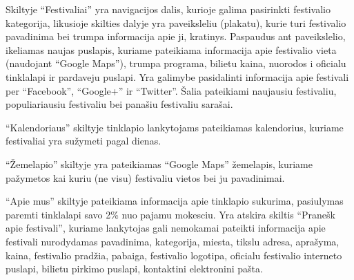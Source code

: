 ﻿\documentclass{VUMIFPSkursinis}
\begin{document}
Skiltyje “Festivaliai” yra navigacijos dalis, kurioje galima pasirinkti festivalio kategorija, likusioje skilties dalyje yra paveiksleliu (plakatu), kurie turi festivalio pavadinima bei trumpa informacija apie ji, kratinys. Paspaudus ant paveikslelio, ikeliamas naujas puslapis, kuriame pateikiama informacija apie festivalio vieta (naudojant “Google Maps”), trumpa programa, bilietu kaina, nuorodos i oficialu tinklalapi ir pardaveju puslapi. Yra galimybe pasidalinti informacija apie festivali per “Facebook”, “Google+” ir “Twitter”. Šalia pateikiami naujausiu festivaliu, populiariausiu festivaliu bei panašiu festivaliu sarašai. 

“Kalendoriaus” skiltyje tinklapio lankytojams pateikiamas kalendorius, kuriame festivaliai yra sužymeti pagal dienas.

“Žemelapio”  skiltyje yra pateikiamas “Google Maps” žemelapis, kuriame pažymetos kai kuriu (ne visu) festivaliu vietos bei ju pavadinimai.
 
“Apie mus” skiltyje pateikiama informacija apie tinklapio sukurima, pasiulymas paremti tinklalapi savo 2\% nuo pajamu mokesciu.
Yra atskira skiltis “Pranešk apie festivali”, kuriame lankytojas gali nemokamai pateikti informacija apie festivali nurodydamas pavadinima, kategorija, miesta, tikslu adresa, aprašyma, kaina, festivalio pradžia, pabaiga, festivalio logotipa, oficialu festivalio interneto puslapi, bilietu pirkimo puslapi, kontaktini elektronini pašta. 
\end{document}
